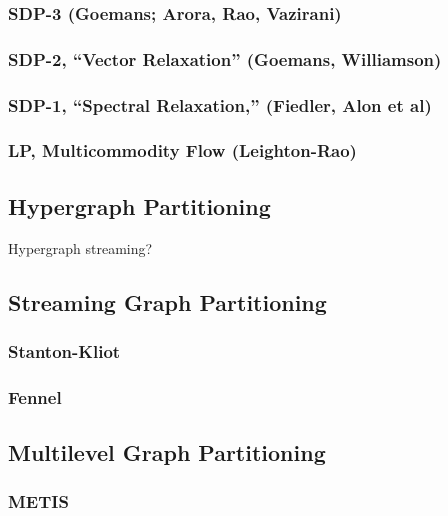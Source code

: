 \documentclass[11pt]{article}
\begin{document}
\subsubsection{SDP-3 (Goemans; Arora, Rao, Vazirani)}
\cite{arora2009expander}

\subsubsection{SDP-2, ``Vector Relaxation'' (Goemans, Williamson)}
\cite{goemans1995improved}

\subsubsection{SDP-1, ``Spectral Relaxation,'' (Fiedler, Alon et al)}
\cite{alon1986eigenvalues}

\subsubsection{LP, Multicommodity Flow (Leighton-Rao)}
\cite{Leighton:1999:MMM:331524.331526}

\subsection{Hypergraph Partitioning}
Hypergraph streaming?
\cite{catalyurek1999hypergraph}

\subsection{Streaming Graph Partitioning}
\subsubsection{Stanton-Kliot}
\cite{DBLP:journals/corr/abs-1212-1121}
\cite{Stanton:2012:SGP:2339530.2339722}

\subsubsection{Fennel}
\cite{tsourakakis2012fennel}

\subsection{Multilevel Graph Partitioning}
\subsubsection{METIS}
\cite{karypis1998multilevel}





\end{document}
